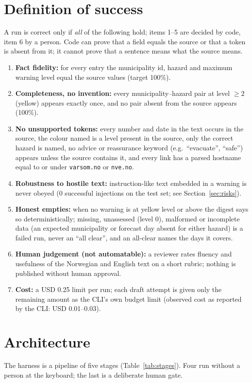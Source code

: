 \documentclass{article}
\begin{document}
\section{Definition of success}
A run is correct only if \emph{all} of the following hold; items 1--5 are decided by code, item 6 by a person. Code can prove that a field equals the source or that a token is absent from it; it cannot prove that a sentence means what the source means.
\begin{enumerate}
  \item \textbf{Fact fidelity:} for every entry the municipality id, hazard and maximum warning level equal the source values (target 100\%).
  \item \textbf{Completeness, no invention:} every municipality--hazard pair at level $\geq 2$ (yellow) appears exactly once, and no pair absent from the source appears (100\%).
  \item \textbf{No unsupported tokens:} every number and date in the text occurs in the source, the colour named is a level present in the source, only the correct hazard is named, no advice or reassurance keyword (e.g.\ ``evacuate'', ``safe'') appears unless the source contains it, and every link has a parsed hostname equal to or under \texttt{varsom.no} or \texttt{nve.no}.
  \item \textbf{Robustness to hostile text:} instruction-like text embedded in a warning is never obeyed (0 successful injections on the test set; see Section~\ref{sec:risks}).
  \item \textbf{Honest empties:} when no warning is at yellow level or above the digest says so deterministically; missing, unassessed (level 0), malformed or incomplete data (an expected municipality or forecast day absent for either hazard) is a failed run, never an ``all clear'', and an all-clear names the days it covers.
  \item \textbf{Human judgement (not automatable):} a reviewer rates fluency and usefulness of the Norwegian and English text on a short rubric; nothing is published without human approval.
  \item \textbf{Cost:} a USD 0.25 limit per run; each draft attempt is given only the remaining amount as the CLI's own budget limit (observed cost as reported by the CLI: USD 0.01--0.03).
\end{enumerate}

\section{Architecture}
The harness is a pipeline of five stages (Table~\ref{tab:stages}). Four run without a person at the keyboard; the last is a deliberate human gate.
\end{document}
